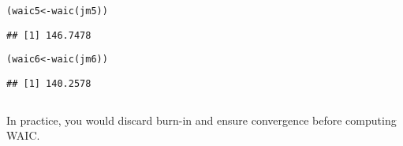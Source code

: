 \documentclass[color=usenames,dvipsnames]{beamer}\usepackage[]{graphicx}\usepackage[]{xcolor}
\makeatletter
\newcommand{\hldef}[1]{\textcolor[rgb]{0,0,0}{#1}}%
\newcommand{\hlkwb}[1]{\textcolor[rgb]{0,0.341,0.682}{#1}}%
\newcommand{\hlkwd}[1]{\textcolor[rgb]{0.004,0.004,0.506}{#1}}%
\newenvironment{kframe}{%
 \def\at@end@of@kframe{}%
 \ifinner\ifhmode%
  \def\at@end@of@kframe{\end{minipage}}%
  \begin{minipage}{\columnwidth}%
 \fi\fi%
 \def\FrameCommand##1{\hskip\@totalleftmargin \hskip-\fboxsep
 \colorbox{shadecolor}{##1}\hskip-\fboxsep
     \hskip-\linewidth \hskip-\@totalleftmargin \hskip\columnwidth}%
 \MakeFramed {\advance\hsize-\width
   \@totalleftmargin\z@ \linewidth\hsize
   \@setminipage}}%
 {\par\unskip\endMakeFramed%
 \at@end@of@kframe}
\newenvironment{knitrout}{}{} %
\makeatother
\begin{document}
\begin{frame}[fragile]
\begin{columns}
\begin{column}{0.5\textwidth}
\begin{knitrout}
\end{knitrout}
\begin{knitrout}\scriptsize
{}\color{fgcolor}\begin{kframe}
\begin{alltt}
\hldef{(waic5} \hlkwb{<-} \hlkwd{waic}\hldef{(jm5))}
\end{alltt}
\begin{verbatim}
## [1] 146.7478
\end{verbatim}
\end{kframe}
\end{knitrout}
\begin{knitrout}\scriptsize
{}\color{fgcolor}\begin{kframe}
\begin{alltt}
\hldef{(waic6} \hlkwb{<-} \hlkwd{waic}\hldef{(jm6))}
\end{alltt}
\begin{verbatim}
## [1] 140.2578
\end{verbatim}
\end{kframe}
\end{knitrout}
    \end{column}
  \end{columns}
  \pause
  \vfill
  In practice, you would discard burn-in and ensure convergence before
  computing WAIC.
\end{frame}
\end{document}
